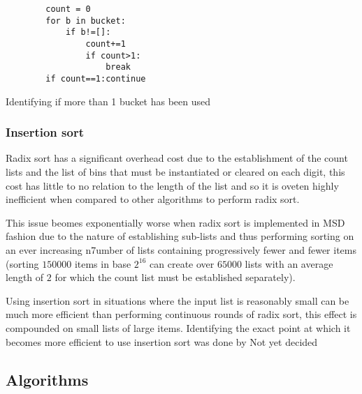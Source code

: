 \documentclass[12pt]{article}
\begin{document}
\begin{table}[H]
	\centering
	\begin{lstlisting}
		count = 0
		for b in bucket:
			if b!=[]:
				count+=1
				if count>1:
					break
		if count==1:continue
	\end{lstlisting}
	\caption*{Identifying if more than 1 bucket has been used}
\end{table}


\subsubsection{Insertion sort}
Radix sort has a significant overhead cost due to the establishment of the count lists and the list of bins that must be instantiated or cleared on each digit, this cost has little to no relation to the length of the list and so it is oveten highly inefficient when compared to other algorithms to perform radix sort.
\par
This issue beomes exponentially worse when radix sort is implemented in MSD fashion due to the nature of establishing sub-lists and thus performing sorting on an ever increasing n7umber of lists containing progressively fewer and fewer items (sorting $150000$ items in base $2^{16}$ can create over $65000$ lists with an average length of $2$ for which the count list must be established separately).
\par
Using insertion sort in situations where the input list is reasonably small can be much more efficient than performing continuous rounds of radix sort, this effect is compounded on small lists of large items. Identifying the exact point at which it becomes more efficient to use insertion sort was done by {\color{orange} Not yet decided}

\pagebreak
\subsection{Algorithms}
\label{ssec:algorithms}
\end{document}
